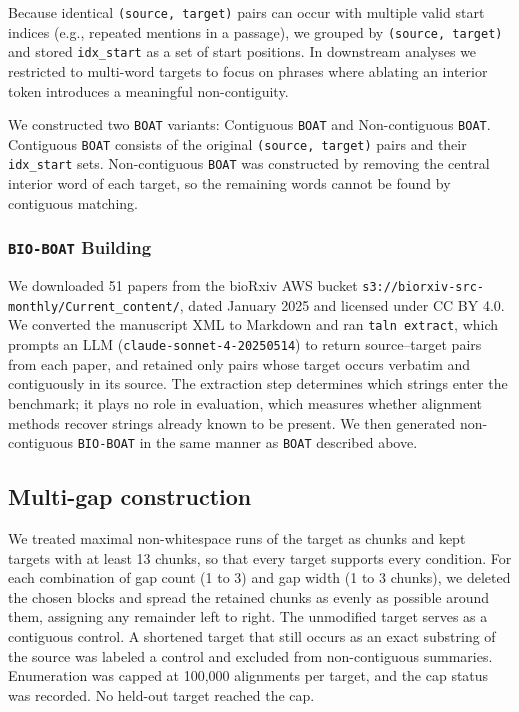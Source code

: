 \documentclass[pdflatex,lineno,referee,sn-vancouver-num]{sn-jnl}
\theoremstyle{thmstyleone}
\theoremstyle{thmstylethree}
\theoremstyle{thmstyletwo}
\begin{document}
Because identical \texttt{(source, target)} pairs can occur with multiple valid start indices (e.g., repeated mentions in a passage), we grouped by \texttt{(source, target)} and stored \texttt{idx\_start} as a set of start positions. In downstream analyses we restricted to multi-word targets to focus on phrases where ablating an interior token introduces a meaningful non-contiguity.

We constructed two \texttt{BOAT} variants: Contiguous \texttt{BOAT} and Non-contiguous \texttt{BOAT}. Contiguous \texttt{BOAT} consists of the original \texttt{(source, target)} pairs and their \texttt{idx\_start} sets. Non-contiguous \texttt{BOAT} was constructed by removing the central interior word of each target, so the remaining words cannot be found by contiguous matching.

\subsubsection{\texttt{BIO-BOAT} Building}
We downloaded 51 papers from the bioRxiv AWS bucket \texttt{s3://biorxiv-src-monthly/Current\_content/}, dated January 2025 and licensed under CC BY 4.0. We converted the manuscript XML to Markdown and ran \texttt{taln extract}, which prompts an LLM (\texttt{claude-sonnet-4-20250514}) to return source–target pairs from each paper, and retained only pairs whose target occurs verbatim and contiguously in its source. The extraction step determines which strings enter the benchmark; it plays no role in evaluation, which measures whether alignment methods recover strings already known to be present. We then generated non-contiguous \texttt{BIO-BOAT} in the same manner as \texttt{BOAT} described above.

\subsection{Multi-gap construction}
We treated maximal non-whitespace runs of the target as chunks and kept targets with at least 13 chunks, so that every target supports every condition. For each combination of gap count (1 to 3) and gap width (1 to 3 chunks), we deleted the chosen blocks and spread the retained chunks as evenly as possible around them, assigning any remainder left to right. The unmodified target serves as a contiguous control. A shortened target that still occurs as an exact substring of the source was labeled a control and excluded from non-contiguous summaries. Enumeration was capped at 100,000 alignments per target, and the cap status was recorded. No held-out target reached the cap.
\end{document}
